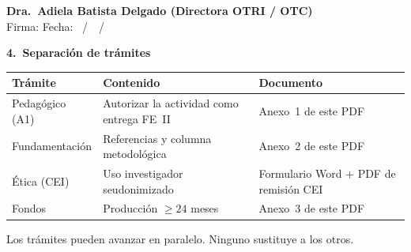 \documentclass[11pt,a4paper]{scrartcl}
\newcommand{\AnnexTitle}[1]{%
  \clearpage
  \LogoRow
  \begin{center}{\Large\sffamily\bfseries #1}\end{center}
  \vspace{0.4em}
  \noindent{\color{rulegray}\hrule height 0.4pt}
  \vspace{0.5em}
}
\begin{document}
\vspace{0.7em}
\noindent\textbf{Dra.\ Adiela Batista Delgado (Directora OTRI / OTC)}\\
Firma: \hrulefill\quad Fecha: \underline{\hspace{1.1cm}}~/~\underline{\hspace{1.1cm}}~/~\underline{\hspace{2cm}}

\AnnexTitle{4.\ Separación de trámites}

\renewcommand{\arraystretch}{1.25}
\begin{tabularx}{\textwidth}{@{}>{\raggedright\arraybackslash}p{3.2cm}X>{\raggedright\arraybackslash}p{3.8cm}@{}}
  \toprule
  \textbf{Trámite} & \textbf{Contenido} & \textbf{Documento} \\
  \midrule
  Pedagógico (A1) & Autorizar la actividad como entrega FE~II & Anexo~1 de este PDF \\
  Fundamentación & Referencias y columna metodológica & Anexo~2 de este PDF \\
  Ética (CEI) & Uso investigador seudonimizado & Formulario Word + PDF de remisión CEI \\
  Fondos & Producción $\geq 24$ meses & Anexo~3 de este PDF \\
  \bottomrule
\end{tabularx}

\vspace{0.6em}
\noindent Los trámites pueden avanzar en paralelo. Ninguno sustituye a los otros.

\vspace{1em}
\AIAuthorshipDeclaration

\vspace{0.8em}
\AuthorshipLicenseBlock

\vspace{1em}
\AuthoritiesBlock

\vspace{0.5em}
\LegalEntities
\end{document}
